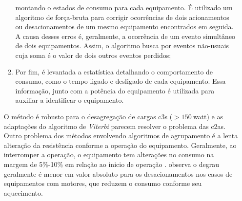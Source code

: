 \begin{enumerate}[label=\textbf{1.\arabic*},wide=\parindent]
\begin{enumerate}[label=\arabic*]
montando o estados de consumo para cada equipamento. É utilizado um
algoritmo de força-bruta para corrigir ocorrências de dois acionamentos
ou desacionamentos de um mesmo equipamento encontrados em seguida. A causa
desses erros é, geralmente, a ocorrência de um evento simultâneo de
dois equipamentos. Assim, o algoritmo busca por eventos não-usuais
cuja soma é o valor de dois outros eventos perdidos;
\item Por fim, é levantada a estatística detalhando o
comportamento de consumo, como o tempo ligado e desligado de cada
equipamento. Essa informação, junto com a potência do equipamento é
utilizada para auxiliar a identificar o equipamento.
\end{enumerate}

O método é robusto para o desagregação de cargas \glspl{c3}
($> 150~$\acs{watt}) e as adaptações \cite{nilm_bouloutas_viterbi_ext_1991_11,
nilm_hart_fsm_viterbi_1993_12} do algoritmo de \emph{Viterbi}
parecem resolver o problema das \glspl{c2a}. Outro problema dos métodos
envolvendo algoritmos de agrupamento é a lenta alteração
da resistência conforme a operação do equipamento. Geralmente, ao
interromper a operação, o equipamento tem alterações no consumo na margem
de 5\%-10\% em relação ao inicio de operação
\cite{nilm_sultanem_1991_10}. \citeauthor*{nilm_hart_1992_8} observa
o degrau geralmente é menor em valor absoluto para os desacionamentos
nos casos de equipamentos com motores, que reduzem o consumo conforme
seu aquecimento.


\end{enumerate}
